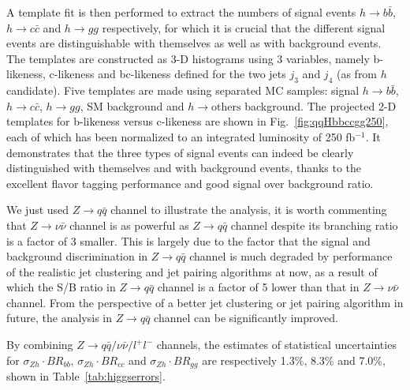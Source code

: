 A template fit is then performed to extract the numbers of signal events $h\to b\bar{b}$,
$h\to c\bar{c}$ and $h\to gg$ respectively, 
for which it is crucial that the different signal events are distinguishable with themselves 
as well as with background events. 
The templates are constructed as 3-D histograms using
3 variables, namely b-likeness, c-likeness and bc-likeness defined for the two jets 
$j_3$ and $j_4$ (as from $h$ candidate). Five templates are made using separated MC samples:
signal $h\to b\bar{b}$, $h\to c\bar{c}$, $h\to gg$, SM background and $h\to\mathrm{others}$ background. 
The projected 2-D templates for b-likeness versus c-likeness are shown in Fig.~\ref{fig:qqHbbccgg250}, 
each of which has been normalized to an integrated luminosity of 250 fb$^{-1}$.
It demonstrates that the three types of signal events can indeed be clearly distinguished
with themselves and with background events, thanks to
the excellent flavor tagging performance and good signal over background ratio.

We just used $Z\to q\bar{q}$ channel to illustrate the analysis, it is worth commenting that 
$Z\to\nu\bar{\nu}$ channel is as powerful as $Z\to q\bar{q}$ channel despite its branching ratio
is a factor of 3 smaller. This is largely due to the factor that the signal and background 
discrimination in $Z\to q\bar{q}$  channel is much degraded by performance of 
the realistic jet clustering and jet pairing algorithms at now, 
as a result of which the S/B ratio in $Z\to q\bar{q}$ channel is a factor of 5
lower than that in $Z\to\nu\bar{\nu}$ channel. From the perspective of a better jet clustering
or jet pairing algorithm in future, the analysis in $Z\to q\bar{q}$ channel can be 
significantly improved.

By combining $Z\to q\bar{q}/\nu\bar{\nu}/l^+l^-$ channels, 
the estimates of statistical uncertainties for $\sigma_{Zh}\cdot BR_{bb}$,
$\sigma_{Zh}\cdot BR_{cc}$ and $\sigma_{Zh}\cdot BR_{gg}$ are respectively
1.3\%, 8.3\% and 7.0\%, shown in Table~\ref{tab:higgserrors}.

